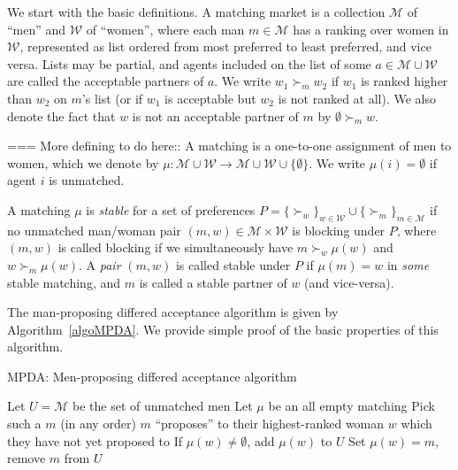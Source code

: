 \documentclass[12pt]{article}
\newcommand{\M}{\mathcal{M}}
\newcommand{\W}{\mathcal{W}}
\begin{document}
  We start with the basic definitions.
  A matching market is a collection $\M$ of ``men'' and $\W$ of ``women'', where
  each man $m\in \M$ has a ranking over women in $\W$, represented
  as list ordered from most preferred to least preferred, and vice versa.
  Lists may be partial, and agents included on the list of some $a \in \M\cup\W$
  are called the acceptable partners of $a$.
  We write $w_1 \succ_m w_2$ if $w_1$ is ranked higher than $w_2$ on $m$'s list
  (or if $w_1$ is acceptable but $w_2$ is not ranked at all).
  We also denote the fact that $w$ is not an acceptable partner of $m$ by
  $\emptyset \succ_m w$.

  === More defining to do here::
  A matching is a one-to-one assignment of men to women, which we denote
  by $\mu : \M\cup \W\to \M\cup \W\cup\{\emptyset\}$.
  We write $\mu(i) = \emptyset$ if
  agent $i$ is unmatched.

  A matching $\mu$ is \emph{stable} for a set of preferences 
  $P = \{\succ_w\}_{w\in\W} \cup \{\succ_m\}_{m\in\M}$
  if no unmatched man/woman pair 
  $(m,w)\in \M\times \W$ is blocking under $P$,
  where $(m,w)$ is called blocking if we simultaneously have
  $m \succ_w \mu(w)$ and $w \succ_m \mu(w)$.
  A \emph{pair} $(m,w)$ is called stable under $P$ if $\mu(m)=w$ in 
  \emph{some} stable matching,
  and $m$ is called a stable partner of $w$ (and vice-versa).

  The man-proposing differed acceptance algorithm is given by
  Algorithm~\ref{algoMPDA}. We provide simple proof of the basic properties of
  this algorithm.

  \begin{algorithm}
    \caption{MPDA: Men-proposing differed acceptance algorithm}
    \label{algoMPDA}
  \begin{algorithmic}[0]
    \State Let $U = \M$ be the set of unmatched men
    \State Let $\mu$ be an all empty matching
      \State Pick such a $m$ (in any order)
      \State $m$ ``proposes'' to their highest-ranked woman $w$ which 
        they have not yet proposed to
        \State If $\mu(w)\ne \emptyset$, add $\mu(w)$ to $U$
        \State Set $\mu(w) = m$, remove $m$ from $U$ 
      \EndIf
    \EndWhile
  \end{algorithmic}
  \end{algorithm}
\end{document}
